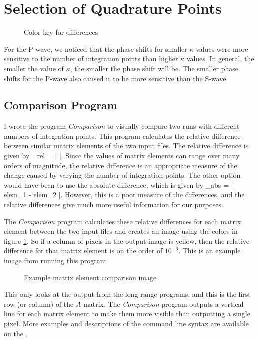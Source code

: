 \documentclass[Dissertation.tex]{subfiles}
\begin{document}
\section{Selection of Quadrature Points}
\label{sec:SelQuadPoints2}

\begin{figure}[H]
	\caption{Color key for differences}
	\label{fig:ColorKey}
\end{figure}

For the P-wave, we noticed that the phase shifts for smaller $\kappa$ values were more sensitive to the number of integration points than higher $\kappa$ values. In general, the smaller the value of $\kappa$, the smaller the phase shift will be. The smaller phase shifts for the P-wave also caused it to be more sensitive than the S-wave.

\subsection{Comparison Program}
I wrote the program \emph{Comparison} \cite{} to visually compare two runs with different numbers of integration points. This program calculates the relative difference between similar matrix elements of the two input files. The relative difference is given by
\beq
{}_{rel} = \left|  \right|.
\eeq
Since the values of matrix elements can range over many orders of magnitude, the relative difference is an appropriate measure of the change caused by varying the number of integration points. The other option would have been to use the absolute difference, which is given by 
\beq
{}_{abs} = \left| elem_1 - elem_2 \right|.
\eeq
However, this is a poor measure of the differences, and the relative differences give much more useful information for our purposes.

The \emph{Comparison} program calculates these relative differences for each matrix element between the two input files and creates an image using the colors in figure \ref{fig:ColorKey}. So if a column of pixels in the output image is yellow, then the relative difference for that matrix element is on the order of $10^{-6}$. This is an example image from running this program:
\begin{figure}[H]
	\centering
	\caption{Example matrix element comparison image}
	\label{fig:QuadExample}
\end{figure}
This only looks at the output from the long-range programs, and this is the first row (or column) of the $A$ matrix. The \emph{Comparison} program outputs a vertical line for each matrix element to make them more visible than outputting a single pixel. More examples and descriptions of the command line syntax are available on the  \cite{Wiki}.
\end{document}
